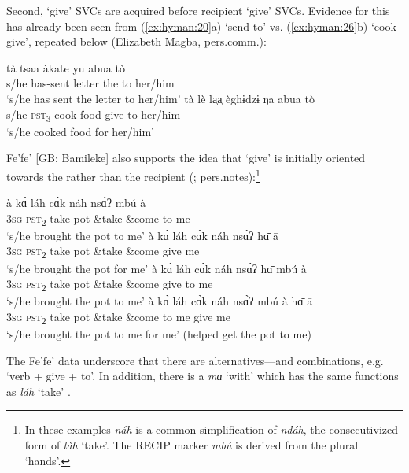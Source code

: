 \documentclass[output=paper]{langsci/langscibook}
\begin{document}
\noindent
Second,  ‘give’ SVCs are acquired before recipient ‘give’ SVCs. Evidence for this has already been seen from  (\ref{ex:hyman:20}a) ‘send to’ vs. (\ref{ex:hyman:26}b) ‘cook give’, repeated below (Elizabeth Magba, pers.comm.):

\ea
\label{ex:hyman:29}
\ea 
\gll tà    tsaa   àkate  yu  abua  tò  \\
s/he has-sent letter   the    to    her/him \\
\glt ‘s/he has sent the letter to her/him’
\ex 
\gll tà    lè     la̹a̹  èghɨdzɨ  ŋa  abua  tò \\
s/he  \textsc{pst}\textsubscript{3}  cook food  give  to  her/him\\
\glt ‘s/he cooked food for her/him’
\z 
\z 

\noindent
Fe’fe’ [GB; Bamileke] also supports the idea that ‘give’ is initially oriented towards the  rather than the recipient (\citealt{Hyman1971}; pers.notes):\footnote{In these examples \textit{náh} is a common simplification of \textit{ndáh}, the consecutivized form of \textit{làh} ‘take’. The RECIP marker \textit{mbú} is derived from the plural ‘hands’.}

\ea
\label{ex:hyman:30}
\ea 
\gll à    k\`ɑ   láh c\`ɑk  náh   ns\`ɑʔ  mbú   à\\
\textsc{3sg} \textsc{pst}\textsubscript{2} take pot \&take \&come to  me\\
\glt ‘s/he brought the pot to me’
\ex 
\gll à    k\`ɑ   láh  c\`ɑk  náh   ns\`ɑʔ   h\=ɑ   ā  \\
\textsc{3sg} \textsc{pst}\textsubscript{2} take pot \&take \&come give me\\
\glt ‘s/he brought the pot for me’
\ex 
\gll à    k\`ɑ   láh  c\`ɑk  náh   ns\`ɑʔ   h\=ɑ   mbú  à  \\
\textsc{3sg} \textsc{pst}\textsubscript{2} take pot \&take \&come give to me\\
\glt ‘s/he brought the pot to me’
\ex 
\gll à    k\`ɑ   láh  c\`ɑk  náh   ns\`ɑʔ  mbú   à  h\=ɑ   ā  \\
\textsc{3sg} \textsc{pst}\textsubscript{2} take pot  \&take \&come to me give me \\
\glt ‘s/he brought the pot to me for me’ (helped get the pot to me)
\z 
\z 

\noindent
The Fe’fe’ data underscore that there are alternatives—and combinations, e.g. ‘verb + give + to’. In addition, there is a  \textit{mɑ} ‘with’ which has the same functions as \textit{láh} ‘take’ \citep[33--37]{Hyman1971}.
\end{document}
